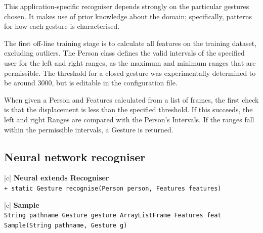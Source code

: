 \documentclass[12pt,a4,notitlepage]{report}
\renewcommand{\_}{\texttt{\symbol{95}}}
\newcommand{\<}{\texttt{\symbol{60}}}
\renewcommand{\>}{\texttt{\symbol{62}}}
\newcommand{\class}[1]{\textbf{#1}}
\newcommand{\variable}[1]{\texttt{#1}}
\begin{document}
{This application-specific recogniser depends strongly on the particular gestures chosen. It makes use of prior knowledge about the domain; specifically, patterns for how each gesture is characterised.

The first off-line training stage is to calculate all features on the training dataset, excluding outliers. The Person class defines the valid intervals of the specified user for the left and right ranges, as the maximum and minimum ranges that are permissible. The threshold for a closed gesture was experimentally determined to be around 3000, but is editable in the configuration file.

When given a Person and Features calculated from a list of frames, the first check is that the displacement is less than the specified threshold. If this succeeds, the left and right Ranges are compared with the Person's Intervals. If the ranges fall within the permissible intervals, a Gesture is returned.

\newpage

\subsection{Neural network recogniser}

\begin{tabular}{|c|} \hline 
\class{Neural extends Recogniser} \\ \hline
{}
{ \variable{+ static Gesture recognise(Person person, Features features)
} } \\ \hline
\end{tabular}

\begin{tabular}{|c|} \hline 
\class{Sample} \\ \hline
{}
{\variable{String pathname \newline
Gesture gesture \newline
ArrayList\<Frame\> \newline
Features feat \newline
Sample(String pathname, Gesture g)
} } \\ \hline
\end{tabular}

}
\end{document}

